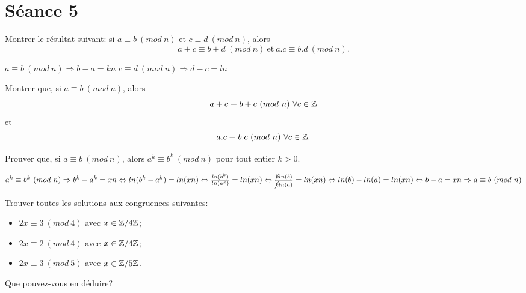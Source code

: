 
\section{Séance 5}

\begin{exo}
Montrer le r\'esultat suivant: si $a\equiv b ~(mod~n)$ et $c\equiv d ~(mod~n)$, alors
$$ a+c \equiv b+d ~(mod~n) ~\mathrm{et}~ a.c \equiv b.d ~(mod~n).$$
\end{exo}

$a\equiv b ~(mod~n) \Rightarrow b - a = kn $ \hspace{1cm} $c\equiv d ~(mod~n) \Rightarrow d - c = ln $ 


\vspace*{0.8cm}
\begin{exo}
Montrer que, si $a\equiv b ~(mod~n)$, alors $$a+c\equiv b+c ~(mod~n) ~\forall c \in \mathbb{Z}$$ et $$a.c\equiv b.c ~(mod~n) ~\forall c \in \mathbb{Z}.$$ 
\end{exo}


\vspace*{0.8cm}
\begin{exo}
Prouver que, si $a\equiv b ~(mod~n)$, alors $a^k\equiv b^k ~(mod~n)$ pour tout entier $k>0$.
\end{exo}

$a^{k}\equiv b^{k} ~(mod~n) \Rightarrow b^{k} - a^{k} = xn \Leftrightarrow ln(b^{k} - a^{k}) = ln(xn) \Leftrightarrow \frac{ln(b^{k})}{ln(a^k)} = ln(xn) \Leftrightarrow \frac{\cancel{k}ln(b)}{\cancel{k}ln(a)} = ln(xn) \Leftrightarrow ln(b) - ln(a) = ln(xn) \Leftrightarrow b - a = xn \Rightarrow a\equiv b ~(mod~n)$


\vspace*{0.8cm}
\begin{exo}
Trouver toutes les solutions aux congruences suivantes:
\begin{itemize}
\item $2x \equiv 3 ~(mod~4)$ avec $x \in \mathbb{Z}/4\mathbb{Z}$;
\item $2x \equiv 2 ~(mod~4)$ avec $x \in \mathbb{Z}/4\mathbb{Z}$;
\item $2x \equiv 3 ~(mod~5)$ avec $x \in \mathbb{Z}/5\mathbb{Z}$.
\end{itemize}
Que pouvez-vous en d\'eduire?
\end{exo}

